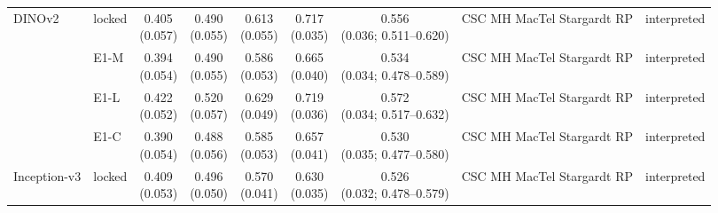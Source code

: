 \begin{longtable}{@{}p{3.2cm}lcccccp{2.4cm}p{2.2cm}@{}}
\addlinespace[2pt]
DINOv2 & locked & \makecell{0.405\\{\scriptsize (0.057)}} & \makecell{0.490\\{\scriptsize (0.055)}} & \makecell{0.613\\{\scriptsize (0.055)}} & \makecell{0.717\\{\scriptsize (0.035)}} & \makecell{0.556\\{\scriptsize (0.036; 0.511--0.620)}} & CSC MH MacTel Stargardt RP & interpreted \\
 & E1-M & \makecell{0.394\\{\scriptsize (0.054)}} & \makecell{0.490\\{\scriptsize (0.055)}} & \makecell{0.586\\{\scriptsize (0.053)}} & \makecell{0.665\\{\scriptsize (0.040)}} & \makecell{0.534\\{\scriptsize (0.034; 0.478--0.589)}} & CSC MH MacTel Stargardt RP & interpreted \\
 & E1-L & \makecell{0.422\\{\scriptsize (0.052)}} & \makecell{0.520\\{\scriptsize (0.057)}} & \makecell{0.629\\{\scriptsize (0.049)}} & \makecell{0.719\\{\scriptsize (0.036)}} & \makecell{0.572\\{\scriptsize (0.034; 0.517--0.632)}} & CSC MH MacTel Stargardt RP & interpreted \\
 & E1-C & \makecell{0.390\\{\scriptsize (0.054)}} & \makecell{0.488\\{\scriptsize (0.056)}} & \makecell{0.585\\{\scriptsize (0.053)}} & \makecell{0.657\\{\scriptsize (0.041)}} & \makecell{0.530\\{\scriptsize (0.035; 0.477--0.580)}} & CSC MH MacTel Stargardt RP & interpreted \\
\addlinespace[2pt]
Inception-v3 & locked & \makecell{0.409\\{\scriptsize (0.053)}} & \makecell{0.496\\{\scriptsize (0.050)}} & \makecell{0.570\\{\scriptsize (0.041)}} & \makecell{0.630\\{\scriptsize (0.035)}} & \makecell{0.526\\{\scriptsize (0.032; 0.478--0.579)}} & CSC MH MacTel Stargardt RP & interpreted \\

\end{longtable}
